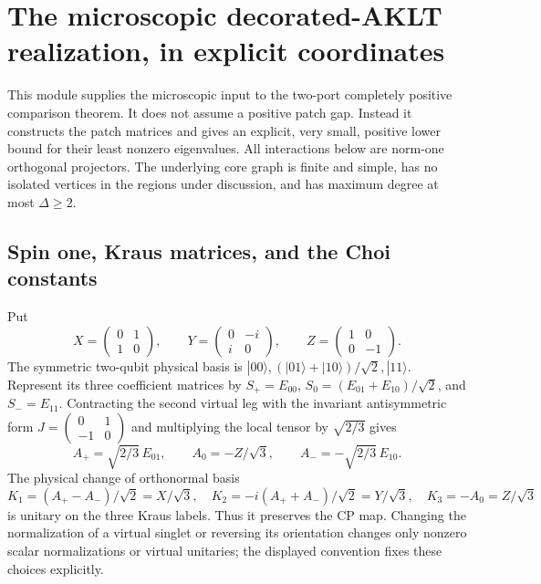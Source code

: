 \section{The microscopic decorated-AKLT realization, in explicit coordinates}
\label{urgent:aklt-realization}

This module supplies the microscopic input to the two-port completely
positive comparison theorem. It does not assume a positive patch gap.
Instead it constructs the patch matrices and gives an explicit, very
small, positive lower bound for their least nonzero eigenvalues. All
interactions below are norm-one orthogonal projectors. The underlying
core graph is finite and simple, has no isolated vertices in the regions
under discussion, and has maximum degree at most $\Delta\geq2$.

\subsection{Spin one, Kraus matrices, and the Choi constants}

Put
\[
 X=\begin{pmatrix}0&1\\1&0\end{pmatrix},\qquad
 Y=\begin{pmatrix}0&-i\\i&0\end{pmatrix},\qquad
 Z=\begin{pmatrix}1&0\\0&-1\end{pmatrix}.
\]
The symmetric two-qubit physical basis is
$|00\rangle,(|01\rangle+|10\rangle)/\sqrt2,|11\rangle$.
Represent its three coefficient matrices by
$S_+=E_{00}$, $S_0=(E_{01}+E_{10})/\sqrt2$, and $S_-=E_{11}$.
Contracting the second virtual leg with the invariant antisymmetric
form $J=\left(\begin{smallmatrix}0&1\\-1&0\end{smallmatrix}\right)$
and multiplying the local tensor by $\sqrt{2/3}$ gives
\[
 A_+=\sqrt{2/3}\,E_{01},\qquad
 A_0=-Z/\sqrt3,\qquad A_-=-\sqrt{2/3}\,E_{10}.
\]
The physical change of orthonormal basis
\[
 K_1=(A_+-A_-)/\sqrt2=X/\sqrt3,\quad
 K_2=-i(A_++A_-)/\sqrt2=Y/\sqrt3,\quad
 K_3=-A_0=Z/\sqrt3
\]
is unitary on the three Kraus labels. Thus it preserves the CP map.
Changing the normalization of a virtual singlet or reversing its
orientation changes only nonzero scalar normalizations or virtual
unitaries; the displayed convention fixes these choices explicitly.

